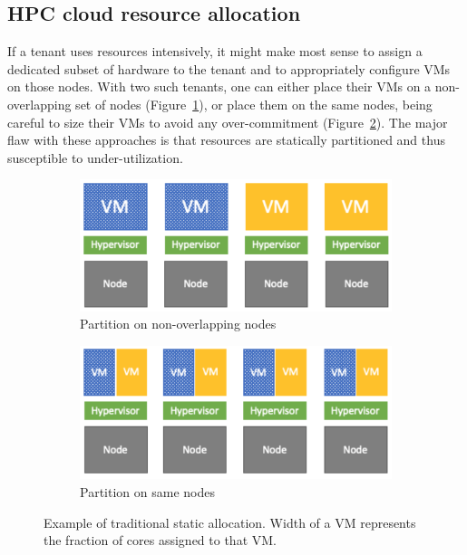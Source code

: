\subsection{HPC cloud resource allocation}
If a tenant uses resources intensively, it might make most sense to assign 
a dedicated subset of hardware to the tenant and to appropriately configure VMs on those nodes. 
With two such tenants, one can either place their VMs on a non-overlapping set of nodes (Figure~\ref{fig:allocation1}), 
or place them on the same nodes, being careful to size their VMs to avoid any over-commitment (Figure~\ref{fig:allocation2}). 
The major flaw with these approaches is that resources are statically partitioned and thus susceptible to under-utilization. 

\begin{figure}
     \centering
     \begin{subfigure}[b]{0.35\textwidth}
         \centering
         \includegraphics[width=\textwidth]{Figures/allocation1.pdf}
         \caption{Partition on non-overlapping nodes}
         \label{fig:allocation1}
     \end{subfigure}
     \hfill
     \begin{subfigure}[b]{0.35\textwidth}
         \centering
         \includegraphics[width=\textwidth]{Figures/allocation2.pdf}
         \caption{Partition on same nodes}
         \label{fig:allocation2}
     \end{subfigure}
     \caption{Example of traditional static allocation. Width of a VM represents
     the fraction of cores assigned to that VM.}
     \label{fig:static_allo}
     \vspace{-0.2in}
\end{figure}



